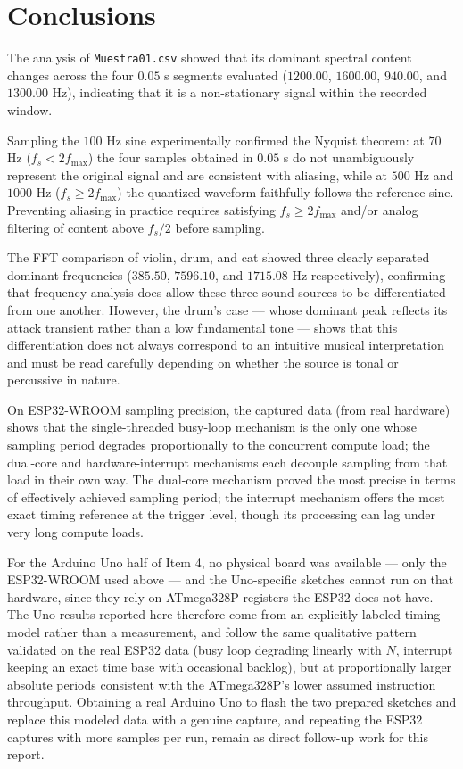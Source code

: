 
\section{Conclusions}

The analysis of \texttt{Muestra01.csv} showed that its dominant spectral content changes across the four $0.05$ s segments evaluated ($1200.00$, $1600.00$, $940.00$, and $1300.00$ Hz), indicating that it is a non-stationary signal within the recorded window.

Sampling the $100$ Hz sine experimentally confirmed the Nyquist theorem: at $70$ Hz ($f_s < 2f_{\max}$) the four samples obtained in $0.05$ s do not unambiguously represent the original signal and are consistent with aliasing, while at $500$ Hz and $1000$ Hz ($f_s \geq 2f_{\max}$) the quantized waveform faithfully follows the reference sine. Preventing aliasing in practice requires satisfying $f_s \geq 2f_{\max}$ and/or analog filtering of content above $f_s/2$ before sampling.

The FFT comparison of violin, drum, and cat showed three clearly separated dominant frequencies ($385.50$, $7596.10$, and $1715.08$ Hz respectively), confirming that frequency analysis does allow these three sound sources to be differentiated from one another. However, the drum's case — whose dominant peak reflects its attack transient rather than a low fundamental tone — shows that this differentiation does not always correspond to an intuitive musical interpretation and must be read carefully depending on whether the source is tonal or percussive in nature.

On ESP32-WROOM sampling precision, the captured data (from real hardware) shows that the single-threaded busy-loop mechanism is the only one whose sampling period degrades proportionally to the concurrent compute load; the dual-core and hardware-interrupt mechanisms each decouple sampling from that load in their own way. The dual-core mechanism proved the most precise in terms of effectively achieved sampling period; the interrupt mechanism offers the most exact timing reference at the trigger level, though its processing can lag under very long compute loads.

For the Arduino Uno half of Item 4, no physical board was available — only the ESP32-WROOM used above — and the Uno-specific sketches cannot run on that hardware, since they rely on ATmega328P registers the ESP32 does not have. The Uno results reported here therefore come from an explicitly labeled timing model rather than a measurement, and follow the same qualitative pattern validated on the real ESP32 data (busy loop degrading linearly with $N$, interrupt keeping an exact time base with occasional backlog), but at proportionally larger absolute periods consistent with the ATmega328P's lower assumed instruction throughput. Obtaining a real Arduino Uno to flash the two prepared sketches and replace this modeled data with a genuine capture, and repeating the ESP32 captures with more samples per run, remain as direct follow-up work for this report.
